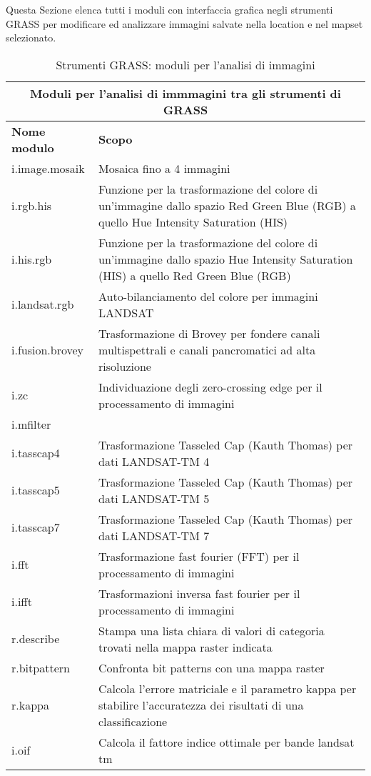 Questa Sezione elenca tutti i moduli con interfaccia grafica negli strumenti GRASS per modificare ed analizzare immagini salvate nella location e nel mapset selezionato.

\begin{table}[ht]
\centering
\caption{Strumenti GRASS: moduli per l'analisi di immagini}\medskip
 \begin{tabular}{|p{4cm}|p{12cm}|}
  \hline \multicolumn{2}{|c|}{\textbf{Moduli per l'analisi di immmagini tra gli strumenti di GRASS}} \\
  \hline \textbf{Nome modulo} & \textbf{Scopo} \\
  \hline i.image.mosaik & Mosaica fino a 4 immagini \\
  \hline i.rgb.his & Funzione per la trasformazione del colore di un'immagine dallo spazio Red Green Blue (RGB) a quello Hue Intensity Saturation (HIS) \\
  \hline i.his.rgb & Funzione per la trasformazione del colore di un'immagine dallo spazio Hue Intensity Saturation (HIS) a quello Red Green Blue (RGB) \\
  \hline i.landsat.rgb & Auto-bilanciamento del colore per immagini LANDSAT \\
  \hline i.fusion.brovey & Trasformazione di Brovey per fondere canali multispettrali e canali pancromatici ad alta risoluzione \\
  \hline i.zc & Individuazione degli zero-crossing edge per il processamento di immagini \\
  \hline i.mfilter &  \\
  \hline i.tasscap4 & Trasformazione Tasseled Cap (Kauth Thomas) per dati LANDSAT-TM 4 \\
  \hline i.tasscap5 & Trasformazione Tasseled Cap (Kauth Thomas) per dati LANDSAT-TM 5 \\
  \hline i.tasscap7 & Trasformazione Tasseled Cap (Kauth Thomas) per dati LANDSAT-TM 7 \\
  \hline i.fft & Trasformazione fast fourier (FFT) per il processamento di immagini \\
  \hline i.ifft & Trasformazioni inversa fast fourier per il processamento di immagini \\
  \hline r.describe & Stampa una lista chiara di valori di categoria trovati nella mappa raster indicata \\
  \hline r.bitpattern & Confronta bit patterns con una mappa raster \\
  \hline r.kappa & Calcola l'errore matriciale e il parametro kappa per stabilire l'accuratezza dei risultati di una classificazione \\
  \hline i.oif & Calcola il fattore indice ottimale per bande landsat tm \\
\hline
\end{tabular}
\end{table}

